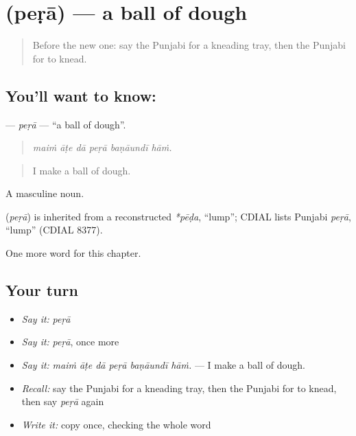 \section[\texorpdfstring{\pa{ਪੇੜਾ} (peṛā)}{ਪੇੜਾ (peṛā)}]{ (peṛā) — a ball of dough}

\label{lesson:PA-C238-pera}



\begin{quote}
Before the new one: say the Punjabi for a kneading tray, then the Punjabi for to knead.
\end{quote}

\subsection*{You'll want to know: }
\textbf{} — \emph{peṛā} — \textquotedblleft{}a ball of dough\textquotedblright{}.

\begin{quote}
     
\end{quote}

\begin{quote}
\emph{maiṁ āṭe dā peṛā baṇāundī hāṁ.}
\end{quote}

\begin{quote}
I make a ball of dough.
\end{quote}

A masculine noun.

\begin{cousinweb}
\textbf{} (\emph{peṛā}) is inherited from a reconstructed \emph{*pēḍa}, \textquotedblleft{}lump\textquotedblright{}; CDIAL lists Punjabi \emph{peṛā}, \textquotedblleft{}lump\textquotedblright{} (CDIAL 8377).
\end{cousinweb}

\begin{grammarlens}[title={What you've built}]
One more word for this chapter.
\end{grammarlens}

\subsection*{Your turn}
\begin{itemize}
\raggedright
  \item \emph{Say it:} \emph{peṛā}
  \item \emph{Say it:} \emph{peṛā}, once more
  \item \emph{Say it:} \emph{maiṁ āṭe dā peṛā baṇāundī hāṁ.} — I make a ball of dough.
  \item \emph{Recall:} say the Punjabi for a kneading tray, then the Punjabi for to knead, then say \emph{peṛā} again
  \item \emph{Write it:} copy \textbf{} once, checking the whole word
\end{itemize}

